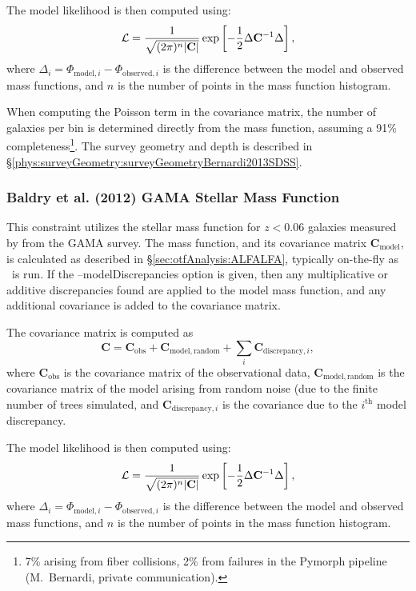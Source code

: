 The model likelihood is then computed using:
\begin{equation}
 \mathcal{L} = {1 \over \sqrt{(2 \pi)^n |\mathbf{C}|}} \exp\left[ -{1\over 2} \Delta \mathbf{C}^{-1} \Delta \right],
\end{equation}
where $\Delta_i = \Phi_{\mathrm{model}, i} - \Phi_{\mathrm{observed}, i}$ is the difference between the model and observed mass functions, and $n$ is the number of points in the mass function histogram.

When computing the Poisson term in the covariance matrix, the number of galaxies per bin is determined directly from the mass function, assuming a 91\% completeness\footnote{7\% arising from fiber collisions, 2\% from failures in the Pymorph pipeline (M.~Bernardi, private communication).}. The survey geometry and depth is described in \S\ref{phys:surveyGeometry:surveyGeometryBernardi2013SDSS}.

\subsubsection{Baldry et al. (2012) GAMA Stellar Mass Function}\label{sec:AnalysisBaldryGAMAStellarMassFunction}

This constraint utilizes the stellar mass function for $z< 0.06$ galaxies measured by \cite{baldry_galaxy_2012} from the GAMA survey. The mass function, and its covariance matrix $\mathbf{C}_\mathrm{model}$, is calculated as described in \S\ref{sec:otfAnalysis:ALFALFA}, typically on-the-fly as \glc\ is run. If the {\normalfont \ttfamily --modelDiscrepancies} option is given, then any multiplicative or additive discrepancies found are applied to the model mass function, and any additional covariance is added to the covariance matrix.

The covariance matrix is computed as
\begin{equation}
 \mathbf{C} = \mathbf{C}_\mathrm{obs} + \mathbf{C}_\mathrm{model,random} + \sum_i \mathbf{C}_{\mathrm{discrepancy}, i},
\end{equation}
where $\mathbf{C}_\mathrm{obs}$ is the covariance matrix of the observational data, $\mathbf{C}_\mathrm{model,random}$ is the covariance matrix of the model arising from random noise (due to the finite number of trees simulated, and $\mathbf{C}_{\mathrm{discrepancy}, i}$ is the covariance due to the $i^\mathrm{th}$ model discrepancy.

The model likelihood is then computed using:
\begin{equation}
 \mathcal{L} = {1 \over \sqrt{(2 \pi)^n |\mathbf{C}|}} \exp\left[ -{1\over 2} \Delta \mathbf{C}^{-1} \Delta \right],
\end{equation}
where $\Delta_i = \Phi_{\mathrm{model}, i} - \Phi_{\mathrm{observed}, i}$ is the difference between the model and observed mass functions, and $n$ is the number of points in the mass function histogram.

